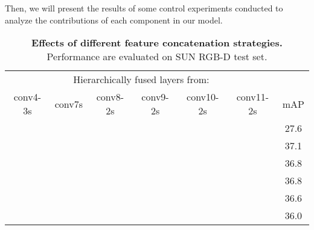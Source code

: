 \documentclass[10pt,twocolumn,letterpaper]{article}
\begin{document}
	Then, we will present the results of some control experiments conducted to analyze the contributions of each component in our model.\par
	\begin{table}[ht]
			\setlength{\tabcolsep}{3.1pt}
			\renewcommand\arraystretch{1.2}
			{
				\centering
				\footnotesize
				\vspace{2mm}
				\begin{tabular}{cccccc|c}
					\hline
					\multicolumn{6}{c|}{Hierarchically fused layers from:}
					& \tabularnewline  
					conv4-3s & conv7s & conv8-2s & conv9-2s & conv10-2s & conv11-2s & mAP \tabularnewline
					\hline
					\Checkmark & & & & & & 27.6 \tabularnewline
					\Checkmark & \Checkmark & & & & & 37.1\tabularnewline
					\Checkmark & \Checkmark & \Checkmark & & & & 36.8\tabularnewline
					\Checkmark & \Checkmark & \Checkmark & \checkmark & & & 36.8\tabularnewline
					\Checkmark & \Checkmark & \Checkmark & \checkmark & \checkmark & & 36.6\tabularnewline
					\Checkmark & \Checkmark & \Checkmark & \checkmark & \checkmark & \checkmark & 36.0\tabularnewline  	
					\hline
				\end{tabular}
			}
			\vspace{-1mm} 
			\caption{\textbf{Effects of different feature concatenation strategies.} Performance are evaluated on SUN RGB-D test set.}
			\label{hierarchical}
			\vspace{-5mm}
		\end{table}
	
\end{document}
